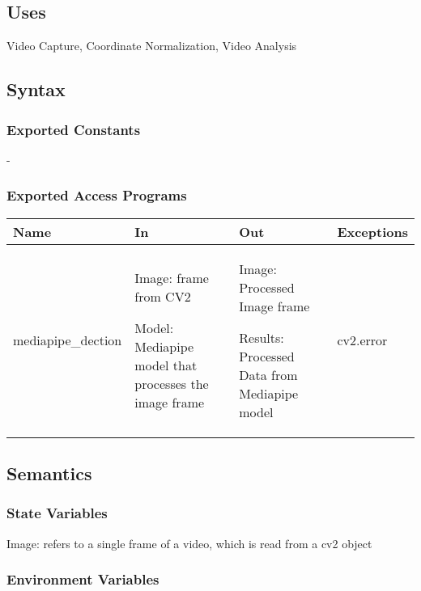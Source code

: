 \documentclass[12pt, titlepage]{article}
\begin{document}
\subsection{Uses}

Video Capture, Coordinate Normalization, Video Analysis\\

\subsection{Syntax}

\subsubsection{Exported Constants}
-

\subsubsection{Exported Access Programs}
\begin{center}
\begin{tabular}{p{5cm} p{3cm} p{3cm} p{4cm}}
\hline
\textbf{Name} & \textbf{In} & \textbf{Out} & \textbf{Exceptions} \\
\hline
mediapipe_dection & 
Image: frame from CV2

Model: Mediapipe model that processes the image frame
 & Image: Processed Image frame

Results: Processed Data from Mediapipe model
 & cv2.error \\
\hline
\end{tabular}
\end{center}

\subsection{Semantics}

\subsubsection{State Variables}

Image: refers to a single frame of a video, which is read from a cv2 object\\

\subsubsection{Environment Variables}
\end{document}
